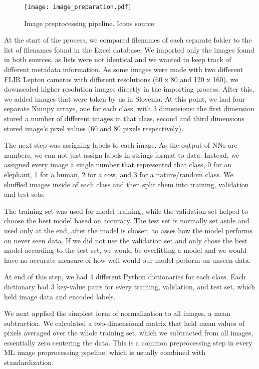 \begin{figure}[ht]
    \centering
    \texttt{[image: image\_preparation.pdf]} 
    \caption{Image preprocessing pipeline. Icons source:\cite{icons}}
    \label{image_preparation}
\end{figure}

At the start of the process, we compared filenames of each separate folder to the list of filenames found in the Excel database.
We imported only the images found in both sources, as lists were not identical and we wanted to keep track of different metadata information.
As some images were made with two different FLIR Lepton cameras with different resolutions (60 x 80 and 120 x 160), we downscaled higher resolution images directly in the importing process.
After this, we added images that were taken by us in Slovenia.
At this point, we had four separate Numpy arrays, one for each class, with 3 dimensions: the first dimension stored a number of different images in that class, second and third dimensions stored image's pixel values (60 and 80 pixels respectively).

The next step was assigning labels to each image.
As the output of NNs are numbers, we can not just assign labels in strings format to data.
Instead, we assigned every image a single number that represented that class, 0 for an elephant, 1 for a human, 2 for a cow, and 3 for a nature/random class.
We shuffled images inside of each class and then split them into training, validation and test sets.

The training set was used for model training, while the validation set helped to choose the best model based on accuracy.
The test set is normally set aside and used only at the end, after the model is chosen, to asses how the model performs on never seen data.
If we did not use the validation set and only chose the best model according to the test set, we would be overfitting a model and we would have no accurate measure of how well would our model perform on unseen data.

At end of this step, we had 4 different Python dictionaries for each class.
Each dictionary had 3 key-value pairs for every training, validation, and test set, which held image data and encoded labels.

We next applied the simplest form of normalization to all images, a mean subtraction.
We calculated a two-dimensional matrix that held mean values of pixels averaged over the whole training set, which we subtracted from all images, essentially zero centering the data.
This is a common preprocessing step in every ML image preprocessing pipeline, which is usually combined with standardization\footnotemark.

